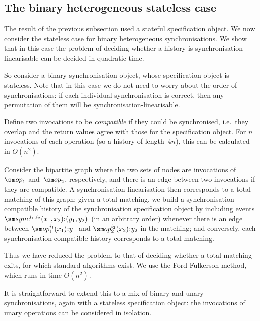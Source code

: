 
\subsection{The binary heterogeneous stateless case}
\label{sec:binary-heterogeneous}

The result of the previous subsection used a stateful specification object.
We now consider the stateless case for binary heterogeneous synchronisations.
We show that in this case the problem of deciding whether a history is
synchronisation linearisable can be decided in quadratic time.

So consider a binary synchronisation object, whose specification object is
stateless.  Note that in this case we do not need to worry about the order of
synchronisations: if each individual synchronisation is correct, then any
permutation of them will be synchronisation-linearisable.

Define two invocations to be \emph{compatible} if they could be synchronised,
i.e.~they overlap and the return values agree with those for the specification
object.  For $n$ invocations of each operation (so a history of length~$4n$),
this can be calculated in $O(n^2)$.

Consider the bipartite graph where the two sets of nodes are invocations
of~$\op_1$ and~$\op_2$, respectively, and there is an edge between two
invocations if they are compatible.  A synchronisation linearisation then
corresponds to a total matching of this graph: given a total matching, we
build a synchronisation-compatible history of the synchronisation
specification object by including events
$\sync^{i_1,i_2}(x_1,x_2)\::(y_1,y_2)$ (in an arbitrary order) whenever there
is an edge between $\op_1^{i_1}(x_1)\::y_1$ and $\op_2^{i_2}(x_2)\::y_2$ in
the matching; and conversely, each synchronisation-compatible history
corresponds to a total matching.

Thus we have reduced the problem to that of deciding whether a total matching
exits, for which standard algorithms exist.  We use the Ford-Fulkerson method,
which runs in time $O(n^2)$.

It is straightforward to extend this to a mix of binary and unary
synchronisations, again with a stateless specification object: the invocations
of unary operations can be considered in isolation.  



